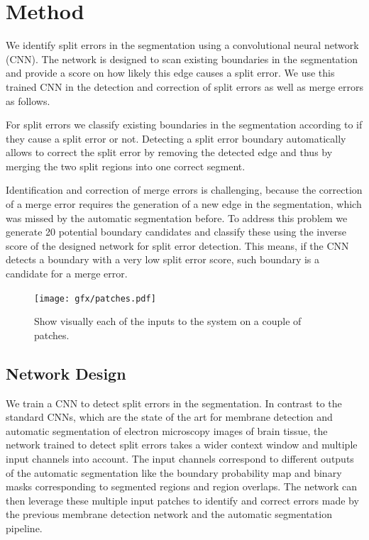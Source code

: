 \section{Method}
We identify split errors in the segmentation using a convolutional neural network (CNN). The network is designed to scan existing boundaries in the segmentation and provide a score on how likely this edge causes a split error. We use this trained CNN in the detection and correction of split errors as well as merge errors as follows.

For split errors we classify existing boundaries in the segmentation according to if they cause a split error or not. Detecting a split error boundary automatically allows to correct the split error by removing the detected edge and thus by merging the two split regions into one correct segment. 

Identification and correction of merge errors is challenging, because the correction of a merge error requires the generation of a new edge in the segmentation, which was missed by the automatic segmentation before. To address this problem we generate 20 potential boundary candidates and classify these using the inverse score of the designed network for split error detection. This means, if the CNN detects a boundary with a very low split error score, such boundary is a candidate for a merge error.

\begin{figure}[t]
\centering
\texttt{[image: gfx/patches.pdf]}
\caption{Show visually each of the inputs to the system on a couple of patches.}
\end{figure}


\subsection{Network Design}
We train a CNN to detect split errors in the segmentation. In contrast to the standard CNNs, which are the state of the art for membrane detection and automatic segmentation of electron microscopy images of brain tissue, the network trained to detect split errors takes a wider context window and multiple input channels into account. The input channels correspond to different outputs of the automatic segmentation like the boundary probability map and binary masks corresponding to segmented regions and region overlaps. The network can then leverage these multiple input patches to identify and correct errors made by the previous membrane detection network and the automatic segmentation pipeline. 

